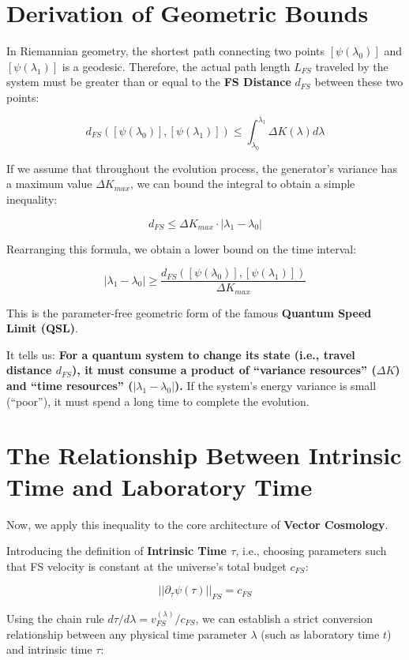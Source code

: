 \section{Derivation of Geometric Bounds}

In Riemannian geometry, the shortest path connecting two points $[\psi(\lambda_0)]$ and $[\psi(\lambda_1)]$ is a geodesic. Therefore, the actual path length $L_{FS}$ traveled by the system must be greater than or equal to the \textbf{FS Distance} $d_{FS}$ between these two points:

\[d_{FS}([\psi(\lambda_0)], [\psi(\lambda_1)]) \le \int_{\lambda_0}^{\lambda_1} \Delta K(\lambda) d\lambda\]

If we assume that throughout the evolution process, the generator's variance has a maximum value $\Delta K_{max}$, we can bound the integral to obtain a simple inequality:

\[d_{FS} \le \Delta K_{max} \cdot |\lambda_1 - \lambda_0|\]

Rearranging this formula, we obtain a lower bound on the time interval:

\[|\lambda_1 - \lambda_0| \ge \frac{d_{FS}([\psi(\lambda_0)], [\psi(\lambda_1)])}{\Delta K_{max}}\]

This is the parameter-free geometric form of the famous \textbf{Quantum Speed Limit (QSL)}.

It tells us: \textbf{For a quantum system to change its state (i.e., travel distance $d_{FS}$), it must consume a product of ``variance resources'' ($\Delta K$) and ``time resources'' ($|\lambda_1 - \lambda_0|$).} If the system's energy variance is small (``poor''), it must spend a long time to complete the evolution.

\section{The Relationship Between Intrinsic Time and Laboratory Time}

Now, we apply this inequality to the core architecture of \textbf{Vector Cosmology}.

Introducing the definition of \textbf{Intrinsic Time $\tau$}, i.e., choosing parameters such that FS velocity is constant at the universe's total budget $c_{FS}$:

\[||\partial_{\tau}\psi(\tau)||_{FS} = c_{FS}\]

Using the chain rule $d\tau/d\lambda = v_{FS}^{(\lambda)}/c_{FS}$, we can establish a strict conversion relationship between any physical time parameter $\lambda$ (such as laboratory time $t$) and intrinsic time $\tau$:

